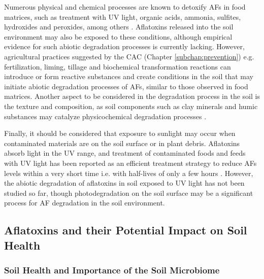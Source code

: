 Numerous physical and chemical processes are known to detoxify AFs in food matrices, such as treatment with UV light, organic acids, ammonia, sulfites, hydroxides and peroxides, among others \citep{pankaj2018review, piva1995detoxification, diao2015ultraviolet, peng2018current}. Aflatoxins released into the soil environment may also be exposed to these conditions, although empirical evidence for such abiotic degradation processes is currently lacking. However, agricultural practices suggested by the CAC (Chapter \ref{subchap:prevention}) e.g. fertilization, liming, tillage and biochemical transformation reactions can introduce or form reactive substances and create conditions in the soil that may initiate abiotic degradation processes of AFs, similar to those observed in food matrices. Another aspect to be considered in the degradation process in the soil is the texture and composition, as soil components such as clay minerals and humic substances may catalyze physicochemical degradation processes \citep{starr2017solvent,fripiat1974clays, birkel2002abiotic, garrido2010clays, wang2020transformation}. 

Finally, it should be considered that exposure to sunlight may occur when contaminated materials are on the soil surface or in plant debris. Aflatoxins absorb light in the UV range, and treatment of contaminated foods and feeds with UV light has been reported as an efficient treatment strategy to reduce AFs levels within a very short time i.e. with half-lives of only a few hours \citep{diao2015ultraviolet}. However, the abiotic degradation of aflatoxins in soil exposed to UV light has not been studied so far, though photodegradation on the soil surface may be a significant process for AF degradation in the soil environment.


\subsection{Aflatoxins and their Potential Impact on Soil Health} \label{subchap:soilhealth}

\subsubsection*{Soil Health and Importance of the Soil Microbiome} \label{subsubchap:soilhealth_definitions}

